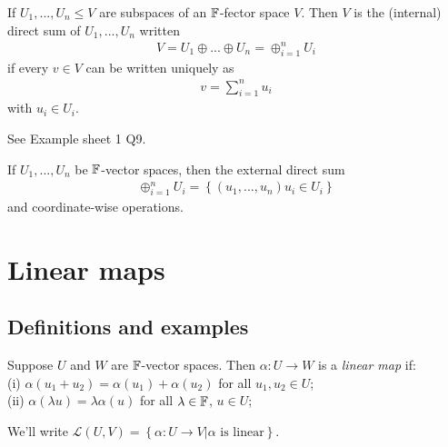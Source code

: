 \documentclass[a4paper]{article}
\begin{document}
\begin{defi}
If $U_1,...,U_n \leq V$ are subspaces of an $\mathbb{F}$-fector space $V$. Then $V$ is the (internal) direct sum of $U_1,...,U_n$ written
\begin{equation*}
\begin{aligned}
V = U_1 \oplus ... \oplus U_n = \oplus_{i=1}^n U_i
\end{aligned}
\end{equation*}
if every $v \in V$ can be written uniquely as
\begin{equation*}
\begin{aligned}
v = \sum_{i=1}^n u_i
\end{aligned}
\end{equation*}
with $u_i \in U_i$.
\end{defi}

See Example sheet 1 Q9.

\begin{defi}
If $U_1,...,U_n$ be $\mathbb{F}$-vector spaces, then the external direct sum
\begin{equation*}
\begin{aligned}
\oplus_{i=1}^n U_i = \left\{\left(u_1,...,u_n\right) u_i \in U_i\right\}
\end{aligned}
\end{equation*}
and coordinate-wise operations.
\end{defi}

\newpage

\section{Linear maps}

\subsection{Definitions and examples}

\begin{defi}
Suppose $U$ and $W$ are $\mathbb{F}$-vector spaces. Then $\alpha:U \to W$ is a \emph{linear map} if:\\
(i) $\alpha \left(u_1+u_2\right) = \alpha\left(u_1\right) + \alpha\left(u_2\right)$ for all $u_1,u_2\in U$;\\
(ii) $\alpha\left(\lambda u\right) = \lambda \alpha\left(u\right)$ for all $\lambda \in \mathbb{F}$, $u \in U$;\\
\end{defi}

\begin{notation}
We'll write $\mathcal{L}\left(U,V\right) = \left\{\alpha:U \to V | \alpha \text{ is linear}\right\}$.
\end{notation}
\end{document}
